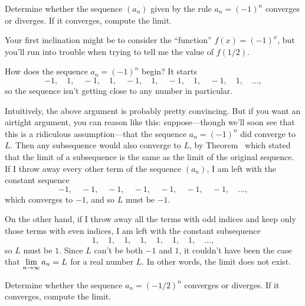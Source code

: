 \begin{example}
\label{example:alternating-ones}
Determine whether the sequence $(a_n)$ given by the rule $a_n = (-1)^n$ converges or
diverges. If it converges, compute the limit.
\end{example}

\begin{solution}
  Your first inclination might be to consider the ``function'' $f(x) =
  (-1)^x$, but you'll run into trouble when trying to tell me the
  value of $f(1/2)$.

  How does the sequence $a_n = (-1)^n$ begin?  It starts
  $$
-1,\quad
1,\quad
-1,\quad
1,\quad
-1,\quad
1,\quad
-1,\quad
1,\quad
-1,\quad
1,\quad\ldots,
  $$
  so the sequence isn't getting close to any number in particular.

  Intuitively, the above argument is probably pretty convincing.  But
  if you want an airtight argument, you can reason like this:
  suppose---though we'll soon see that this is a ridiculous
  assumption---that the sequence $a_n = (-1)^n$ did converge to $L$.
  Then any subsequence would also converge to $L$, by
  Theorem~ which stated that the
  limit of a subsequence is the same as the limit of the original
  sequence.  If I throw away every other term of the sequence $(a_n)$,
  I am left with the constant sequence
$$
-1,\quad
-1,\quad
-1,\quad
-1,\quad
-1,\quad
-1,\quad
-1,\quad\ldots,
$$
which converges to $-1$, and so $L$ must be $-1$.

On the other hand, if I throw away all the terms with odd indices and
keep only those terms with even indices, I am left with the constant
subsequence
$$
1,\quad
1,\quad
1,\quad
1,\quad
1,\quad
1,\quad
1,\quad\ldots,
$$
so $L$ must be $1$.  Since $L$ can't be both $-1$ and $1$, it couldn't
have been the case that $\displaystyle\lim_{n \to \infty} a_n = L$ for a real
number $L$.  In other words, the limit does not exist.
\end{solution}


\begin{example}
Determine whether the sequence $a_n = (-1/2)^n$ converges or
diverges. If it converges, compute the limit.
\end{example}

